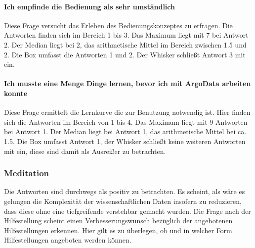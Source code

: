 \paragraph{Ich empfinde die Bedienung als sehr umständlich}
    Diese Frage versucht das Erleben des Bedienungskonzeptes zu erfragen. Die Antworten finden sich im Bereich 1 bis 3. Das Maximum liegt mit 7 bei Antwort 2. Der Median liegt bei 2, das arithmetische Mittel im Bereich zwischen 1.5 und 2. Die Box umfasst die Antworten 1 und 2. Der Whisker schließt Antwort 3 mit ein.
    
\paragraph{Ich musste eine Menge Dinge lernen, bevor ich mit ArgoData arbeiten konnte}
    Diese Frage ermittelt die Lernkurve die zur Benutzung notwendig ist. Hier finden sich die Antworten im Bereich von 1 bis 4. Das Maximum liegt mit 9 Antworten bei Antwort 1. Der Median liegt bei Antwort 1, das arithmetische Mittel bei ca. 1.5. Die Box umfasst Antwort 1, der Whisker schließt keine weiteren Antworten mit ein, diese sind damit als Ausreißer zu betrachten. 
    
\subsubsection{Meditation}
Die Antworten sind durchwegs als positiv zu betrachten. Es scheint, als wäre es gelungen die Komplexität der wissenschaftlichen Daten insofern zu reduzieren, dass diese ohne eine tiefgreifende verstehbar gemacht wurden. Die Frage nach der Hilfestellung scheint einen Verbesserungswunsch bezüglich der angebotenen Hilfestellungen erkennen. Hier gilt es zu überlegen, ob und in welcher Form Hilfestellungen angeboten werden können.



